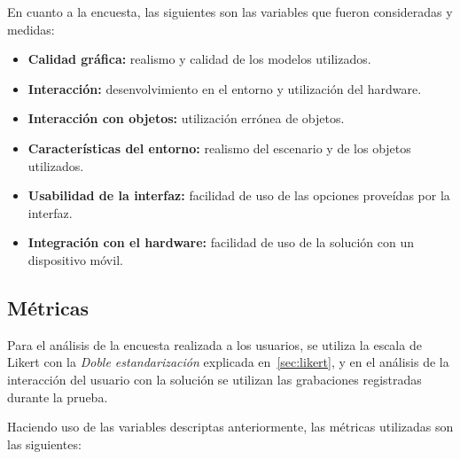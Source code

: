 En cuanto a la encuesta, las siguientes son las variables que fueron consideradas 
y medidas:

\begin{itemize}

\item \textbf{Calidad gráfica:} realismo y calidad de los modelos utilizados.

\item \textbf{Interacción:} desenvolvimiento en el entorno y utilización del 
    hardware.

\item \textbf{Interacción con objetos:} utilización errónea de objetos.

\item \textbf{Características del entorno:} realismo del escenario y de los 
    objetos utilizados.

\item \textbf{Usabilidad de la interfaz:} facilidad de uso de las opciones 
    proveídas por la interfaz.

\item \textbf{Integración con el hardware:} facilidad de uso de la solución con 
    un dispositivo móvil. 

\end{itemize}

\subsection{Métricas}

Para el análisis de la encuesta realizada a los usuarios, se utiliza la escala de Likert
con la \emph{Doble estandarización} explicada en~\ref{sec:likert}, y en el análisis de la 
interacción del usuario con la solución se utilizan las grabaciones registradas durante la 
prueba.

Haciendo uso de las variables descriptas anteriormente, las métricas
utilizadas son las siguientes:

